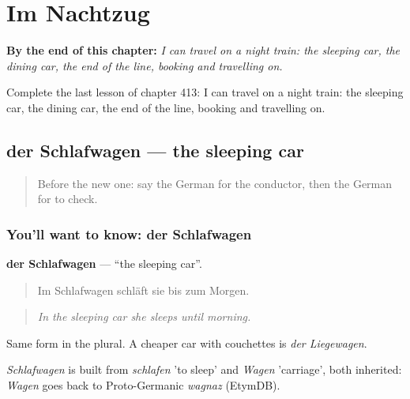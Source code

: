 
\chapter{Im Nachtzug}
\label{ch:ge-im-nachtzug}

\begin{chapteropening}
\textbf{By the end of this chapter:} \emph{I can travel on a night train: the sleeping car, the dining car, the end of the line, booking and travelling on.}

Complete the last lesson of chapter 413: I can travel on a night train: the sleeping car, the dining car, the end of the line, booking and travelling on.
\end{chapteropening}

\section[der Schlafwagen]{der Schlafwagen — the sleeping car}

\label{lesson:GE-C413-schlafwagen}



\begin{quote}
Before the new one: say the German for the conductor, then the German for to check.
\end{quote}

\subsection*{You'll want to know: der Schlafwagen}
\textbf{der Schlafwagen} — \textquotedblleft{}the sleeping car\textquotedblright{}.

\begin{quote}
Im Schlafwagen schläft sie bis zum Morgen.
\end{quote}

\begin{quote}
\emph{In the sleeping car she sleeps until morning.}
\end{quote}

Same form in the plural. A cheaper car with couchettes is \emph{der Liegewagen}.

\begin{cousinweb}
\emph{Schlafwagen} is built from \emph{schlafen} 'to sleep' and \emph{Wagen} 'carriage', both inherited: \emph{Wagen} goes back to Proto-Germanic \emph{wagnaz} (EtymDB).
\end{cousinweb}

